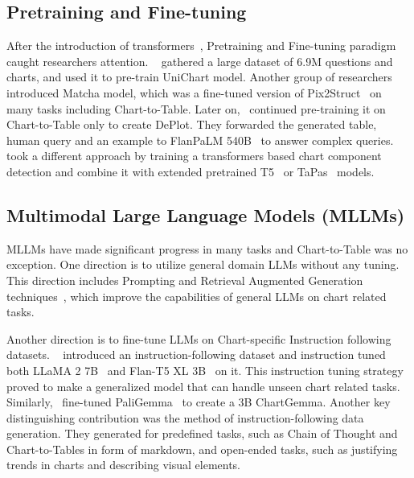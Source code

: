 \documentclass[
	letterpaper, %
]{jdf}
\begin{document}
    \subsection{Pretraining and Fine-tuning}\label{ssect:pretraining-and-fine-tuning}
After the introduction of transformers~\cite{vaswani2017attention}, Pretraining and Fine-tuning paradigm caught researchers attention.
~\cite{masry2023unichart} gathered a large dataset of 6.9M questions and charts, and used it to pre-train UniChart model.
Another group of researchers~\cite{liu2022matcha} introduced Matcha model, which was a fine-tuned version of Pix2Struct~\cite{lee2023pix2struct} on many tasks including Chart-to-Table.
Later on,~\cite{liu2022deplot} continued pre-training it on Chart-to-Table only to create DePlot.
They forwarded the generated table, human query and an example to FlanPaLM 540B~\cite{chung2024scaling} to answer complex queries.
~\cite{cheng2023chartreader} took a different approach by training a transformers based chart component detection and combine it with extended pretrained T5~\cite{raffel2020exploring} or TaPas~\cite{herzig2020tapas} models.

\subsection{Multimodal Large Language Models (MLLMs)}\label{ssect:mllm}
MLLMs have made significant progress in many tasks and Chart-to-Table was no exception.
One direction is to utilize general domain LLMs without any tuning.
This direction includes Prompting and Retrieval Augmented Generation techniques~\cite{cao2024graphinsight, voigt2023vist5}, which improve the capabilities of general LLMs on chart related tasks.

Another direction is to fine-tune LLMs on Chart-specific Instruction following datasets.
~\cite{masry2024chartinstruct} introduced an instruction-following dataset and instruction tuned both LLaMA 2 7B~\cite{touvron2023llama} and Flan-T5 XL 3B~\cite{chung2024scaling} on it.
This instruction tuning strategy proved to make a generalized model that can handle unseen chart related tasks.
Similarly,~\cite{masry2024chartgemma} fine-tuned PaliGemma~\cite{beyer2024paligemma} to create a 3B ChartGemma.
Another key distinguishing contribution was the method of instruction-following data generation.
They generated for predefined tasks, such as Chain of Thought and Chart-to-Tables in form of markdown, and open-ended tasks, such as justifying trends in charts and describing visual elements.
\end{document}
